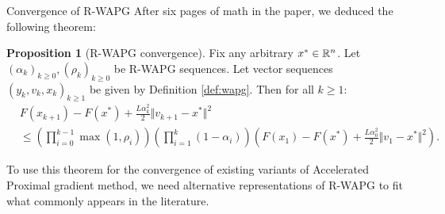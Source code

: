 \documentclass[11pt]{beamer}
\theoremstyle{definition}
\newtheorem{proposition}{Proposition}[section]
\begin{document}
    \begin{frame}{Convergence of R-WAPG}
        After six pages of math in the paper, we deduced the following theorem: 
        \begin{proposition}[R-WAPG convergence]\label{prop:wapg-convergence}
            Fix any arbitrary $x^* \in \mathbb R^n$.
            Let $(\alpha_k)_{k \ge 0}, (\rho_k)_{k \ge 0}$ be R-WAPG sequences.
            Let vector sequences $(y_k, v_{k}, x_{k})_{k \ge 1}$ be given by Definition \ref{def:wapg}. 
            Then for all $k \ge 1$:
            {\small
            \begin{align*}
                & F(x_{k + 1}) - F(x^*) + \frac{L \alpha_k^2}{2}\Vert v_{k + 1} - x^*\Vert^2
                \\
                &\le
                \left(
                    \prod_{i = 0}^{k - 1} \max(1, \rho_{i})
                \right)
                \left(
                    \prod_{i = 1}^{k} \left(1  - \alpha_i\right)
                \right)
                \left(
                    F(x_1) - F(x^*) + \frac{L\alpha_0^2}{2}\Vert v_1 - x^*\Vert^2
                \right).
            \end{align*}
            }
        \end{proposition}
        To use this theorem for the convergence of existing variants of Accelerated Proximal gradient method, we need alternative representations of R-WAPG to fit what commonly appears in the literature. 
    \end{frame}
\end{document}
